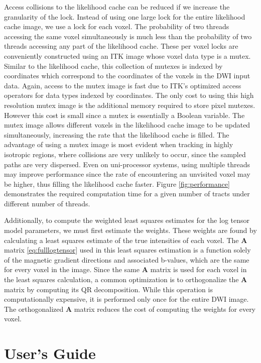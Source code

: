 \documentclass{InsightArticle}
\begin{document}
Access collisions to the likelihood cache can be reduced if we increase the granularity of the lock.  Instead of using one large lock for the entire likelihood cache image, we use a lock for each voxel.  The probability of two threads accessing the same voxel simultaneously is much less than the probability of two threads accessing any part of the likelihood cache.  These per voxel locks are conveniently constructed using an ITK image whose voxel data type is a mutex.  Similar to the likelihood cache, this collection of mutexes is indexed by coordinates which correspond to the coordinates of the voxels in the DWI input data.  Again, access to the mutex image is fast due to ITK's optimized access operators for data types indexed by coordinates.  The only cost to using this high resolution mutex image is the additional memory required to store pixel mutexes.  However this cost is small since a mutex is essentially a Boolean variable.  The mutex image allows different voxels in the likelihood cache image to be updated simultaneously, increasing the rate that the likelihood cache is filled.  The advantage of using a mutex image is most evident when tracking in highly isotropic regions,  where collisions are very unlikely to occur, since the sampled paths are very dispersed.  Even on uni-processor systems, using multiple threads may improve performance since the rate of encountering an unvisited voxel may be higher, thus filling the likelihood cache faster. Figure \ref{fig:performance} demonstrates the required computation time for a given number of tracts under different number of threads.

Additionally, to compute the weighted least squares estimates for the log tensor model parameters, we must first estimate the weights.  These weights are found by calculating a least squares estimate of the true intensities of each voxel.  The $\mathbf{A}$ matrix \ref{eq:fulllogtensor} used in this least squares estimation is a function solely of the magnetic gradient directions and associated b-values, which are the same for every voxel in the image.  Since the same $\mathbf{A}$ matrix is used for each voxel in the least squares calculation, a common optimization is to orthogonalize the $\mathbf{A}$ matrix by computing its QR decomposition.  While this operation is computationally expensive, it is performed only once for the entire DWI image.  The orthogonalized $\mathbf{A}$ matrix reduces the cost of computing the weights for every voxel.



\section{User's Guide}
\end{document}
